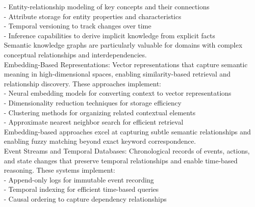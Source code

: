 - Entity-relationship modeling of key concepts and their connections\\ \newline
- Attribute storage for entity properties and characteristics\\ \newline
- Temporal versioning to track changes over time\\ \newline
- Inference capabilities to derive implicit knowledge from explicit facts\\ \newline
Semantic knowledge graphs are particularly valuable for domains with complex conceptual relationships and interdependencies.\\ \newline
Embedding-Based Representations: Vector representations that capture semantic meaning in high-dimensional spaces, enabling similarity-based retrieval and relationship discovery. These approaches implement:\\ \newline
- Neural embedding models for converting context to vector representations\\ \newline
- Dimensionality reduction techniques for storage efficiency\\ \newline
- Clustering methods for organizing related contextual elements\\ \newline
- Approximate nearest neighbor search for efficient retrieval\\ \newline
Embedding-based approaches excel at capturing subtle semantic relationships and enabling fuzzy matching beyond exact keyword correspondence.\\ \newline
Event Streams and Temporal Databases: Chronological records of events, actions, and state changes that preserve temporal relationships and enable time-based reasoning. These systems implement:\\ \newline
- Append-only logs for immutable event recording\\ \newline
- Temporal indexing for efficient time-based queries\\ \newline
- Causal ordering to capture dependency relationships\\ \newline
